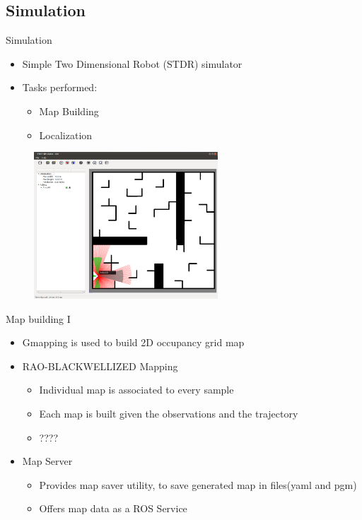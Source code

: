 
\subsection{Simulation}

\begin{frame}{Simulation}
    \begin{itemize}
        \item Simple Two Dimensional Robot (STDR) simulator	
        \item Tasks  performed:
        \begin{itemize}
            \item Map Building
            \item Localization
        \end{itemize}
    \end{itemize}
    
    \centering
    \includegraphics[width=90mm,height=55mm]{gfx/stdr_simulator}
    
\end{frame}
\begin{frame}{Map building I}
    \begin{itemize}
        \item Gmapping is used to build 2D occupancy grid map 
        \item RAO-BLACKWELLIZED Mapping 
        \begin{itemize}
            \item Individual map is associated to every sample
            \item Each map is built given the observations and the
trajectory
            \item ????

        \end{itemize}
        \item Map Server
        \begin{itemize}
            \item Provides map saver utility, to save generated map in files(yaml and pgm)
            \item Offers map data as a ROS Service
        \end{itemize}
        
    \end{itemize}
\end{frame}
